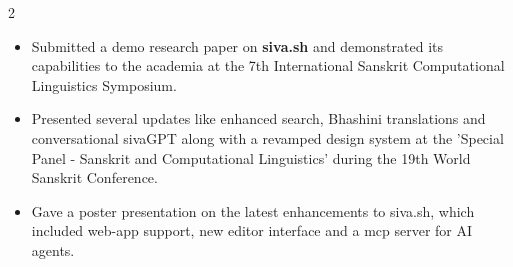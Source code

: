 \documentclass[10pt,a4paper,ragged2e,withhyper]{altacv}
\begin{document}
\begin{paracol}{2}
\bigskip

\medskip
{}
\begin{itemize}
\smallskip
\item Submitted a demo research paper on \textbf{siva.sh} and demonstrated its capabilities to the academia at the 7th International Sanskrit Computational Linguistics Symposium.
\end{itemize}

\divider

\begin{itemize}
\smallskip
\item Presented several updates like enhanced search, Bhashini translations and conversational sivaGPT along with a revamped design system at the 'Special Panel - Sanskrit and Computational Linguistics' during the 19th World Sanskrit Conference.
\end{itemize}

\divider

\begin{itemize}
\smallskip
\item Gave a poster presentation on the latest enhancements to siva.sh, which included web-app support, new editor interface and a mcp server for AI agents.
\end{itemize}









\switchcolumn


\end{paracol}
\end{document}
